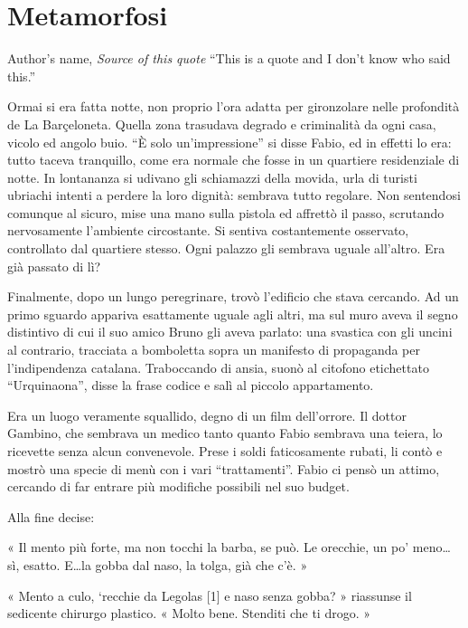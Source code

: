 \chapter{Metamorfosi}

\begin{chapquote}{Author's name, \textit{Source of this quote}}
``This is a quote and I don't know who said this.''
\end{chapquote}

Ormai si era fatta notte, non proprio l'ora adatta per gironzolare nelle profondità de La Barçeloneta. Quella zona trasudava degrado e criminalità da ogni casa, vicolo ed angolo buio. ``È solo un'impressione'' si disse Fabio, ed in effetti lo era: tutto taceva tranquillo, come era normale che fosse in un quartiere residenziale di notte. In lontananza si udivano gli schiamazzi della movida, urla di turisti ubriachi intenti a perdere la loro dignità: sembrava tutto regolare. Non sentendosi comunque al sicuro, mise una mano sulla pistola ed affrettò il passo, scrutando nervosamente l'ambiente circostante. Si sentiva costantemente osservato, controllato dal quartiere stesso. Ogni palazzo gli sembrava uguale all'altro. Era già passato di lì?

Finalmente, dopo un lungo peregrinare, trovò l'edificio che stava cercando. Ad un primo sguardo appariva esattamente uguale agli altri, ma sul muro aveva il segno distintivo di cui il suo amico Bruno gli aveva parlato: una svastica con gli uncini al contrario, tracciata a bomboletta sopra un manifesto di propaganda per l'indipendenza catalana. Traboccando di ansia, suonò al citofono etichettato ``Urquinaona'', disse la frase codice e salì al piccolo appartamento.

Era un luogo veramente squallido, degno di un film dell'orrore. Il dottor Gambino, che sembrava un medico tanto quanto Fabio sembrava una teiera, lo ricevette senza alcun convenevole. Prese i soldi faticosamente rubati, li contò e mostrò una specie di menù con i vari ``trattamenti''. Fabio ci pensò un attimo, cercando di far entrare più modifiche possibili nel suo budget.

Alla fine decise:

« Il mento più forte, ma non tocchi la barba, se può. Le orecchie, un po' meno\ldots sì, esatto. E\ldots la gobba dal naso, la tolga, già che c'è. »

« Mento a culo,  `recchie da Legolas [1] e naso senza gobba? » riassunse il sedicente chirurgo plastico. « Molto bene. Stenditi che ti drogo. »

